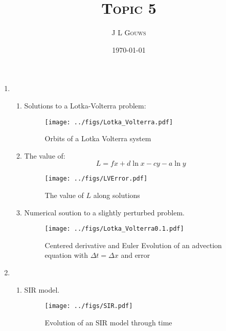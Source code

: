 \documentclass[12pt,a4]{article}
\title{
\textsc{Topic 5}
}
\author{\textsc{J L Gouws}
}
\date{\today
\\[1cm]}
\begin{document}
\thispagestyle{empty}

\maketitle

\begin{enumerate}
  \item
    \begin{enumerate}
      \item
        Solutions to a Lotka-Volterra problem:
        \begin{figure}[H]
          \centering
          \texttt{[image: ../figs/Lotka\_Volterra.pdf]} 
          \caption{Orbits of a Lotka Volterra system}
        \end{figure}

      \item
        The value of:
        \begin{equation*}
          L = f x + d \ln x - cy - a \ln y
        \end{equation*}

        \begin{figure}[H]
          \centering
          \texttt{[image: ../figs/LVError.pdf]}
          \caption{The value of $L$ along solutions}
        \end{figure}

      \item
        Numerical soution to a slightly perturbed problem.
        \begin{figure}[H]
          \centering
          \texttt{[image: ../figs/Lotka\_Volterra0.1.pdf]}
          \caption{Centered derivative and Euler Evolution of an advection equation  with $\Delta t = \Delta x$ and error}
        \end{figure}

    \end{enumerate}
  \item
    \begin{enumerate}
      \item
        SIR model.
        \begin{figure}[H]
          \centering
          \texttt{[image: ../figs/SIR.pdf]}
          \caption{Evolution of an SIR model through time}
        \end{figure}


\end{enumerate}
\end{enumerate}
\end{document}
